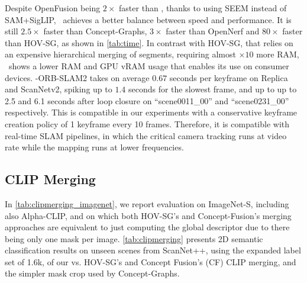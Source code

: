 Despite OpenFusion being \(2\times\) faster than \ours, thanks to using SEEM instead of SAM+SigLIP, ~\ours achieves a better balance between speed and performance. It is still \(2.5\times\) faster than Concept-Graphs, $3\times$ faster than OpenNerf and $80\times$ faster than HOV-SG, as shown in \cref{tab:time}. 
In contrast with HOV-SG, that relies on an expensive hierarchical merging of segments, requiring almost \(\times10\) more RAM, ~\ours shows a lower RAM and GPU vRAM usage that enables its use on consumer devices.
{\ours-ORB-SLAM2 takes on average $0.67$ seconds per keyframe on Replica and ScanNetv2, spiking up to $1.4$ seconds for the slowest frame, and up to up to 2.5 and 6.1 seconds after loop closure on ``scene0011\_00'' and ``scene0231\_00'' respectively. This is compatible in our experiments with a conservative keyframe creation policy of 1 keyframe every 10 frames.%
}
Therefore, it is compatible with real-time SLAM pipelines, in which the critical camera tracking runs at video rate while the mapping runs at lower frequencies.
%

\subsection{{CLIP Merging}}
\label{sec:clipmerger_eval}
In \cref{tab:clipmerging_imagenet}, we report evaluation on ImageNet-S, including also Alpha-CLIP, and on which both HOV-SG's and Concept-Fusion's merging approaches are equivalent to just computing the global descriptor due to there being only one mask per image.
\cref{tab:clipmerging} presents 2D semantic classification results on unseen scenes from ScanNet++, {using} the expanded label set {of 1.6k}, of our \clipours vs. HOV-SG's and Concept Fusion's (CF) CLIP merging, and the simpler mask crop used by Concept-Graphs. 

